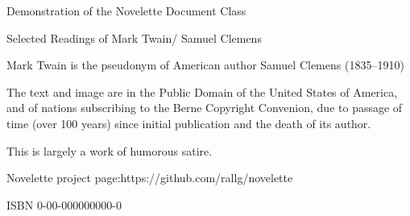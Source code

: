 \documentclass[../interior-demo.tex]{subfiles}
\begin{document}
\begin{fullpage} %
\null\null\null\null\null %
\null\null\null %
\vfill %
{\centering Demonstration of the Novelette Document Class\par}
\end{fullpage}

\begin{fullpage}[role=copyright]
\vfill %
Selected Readings of Mark Twain\br/ Samuel Clemens\par
Mark Twain is the pseudonym of American\br
author Samuel Clemens (1835--1910)\par
The text and image are in the Public Domain\br
of the United States of America, and of nations\br
subscribing to the Berne Copyright Convenion,\br
due to passage of time (over 100 years) since\br
initial publication and the death of its author.\par
This is largely a work of humorous satire.\par
Novelette project page:\br https://github.com/rallg/novelette\par
ISBN 0-00-000000000-0\par
\end{fullpage}
\end{document}
